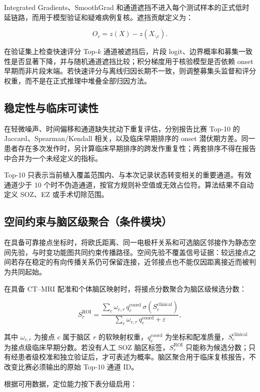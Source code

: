 Integrated Gradients、SmoothGrad 和通道遮挡不进入每个测试样本的正式低时延链路，而用于模型验证和疑难病例复核。遮挡贡献定义为：

$$
O_c=z(X)-z(X_{\setminus c}).
$$

在验证集上检查快速评分 Top-$k$ 通道被遮挡后，片段 logit、边界概率和募集一致性是否显著下降，并与随机通道遮挡比较；积分梯度用于核验模型是否依赖 onset 早期而非片段末端。若快速评分与离线归因长期不一致，则调整募集头监督和评分权重，而不是在正式推理中堆叠全部归因方法。

\subsection{稳定性与临床可读性}

在轻微噪声、时间偏移和通道缺失扰动下重复评估，分别报告比赛 Top-10 的 Jaccard、Spearman/Kendall 相关，以及临床早期排序的 onset 潜伏期方差。同一患者存在多次发作时，另计算临床早期排序的跨发作重复性；两套排序不得在报告中合并为一个未经定义的指标。

Top-10 只表示当前植入覆盖范围内、与本次记录状态转变相关的重要通道。有效通道少于 10 个时不伪造通道，按官方规则补空值或无效占位符。算法结果不自动定义 SOZ、EZ 或手术切除范围。

\subsection{空间约束与脑区级聚合（条件模块）}

在具备可靠接点坐标时，将欧氏距离、同一电极杆关系和可选脑区邻接作为静态空间先验，与时变功能图共同约束传播路径。空间先验不覆盖信号证据：较远接点之间若存在稳定的有向传播关系仍可保留连接，近邻接点也不能仅因距离接近而被判为共同起始。

在具备 CT--MRI 配准和个体脑区映射时，将接点分数聚合为脑区级候选分数：

$$
S_r^{\mathrm{ROI}}=
\frac{\sum_c\omega_{c,r}\,q_c^{\mathrm{coord}}\,\sigma(S_c^{\mathrm{clinical}})}
{\sum_c\omega_{c,r}\,q_c^{\mathrm{coord}}+\varepsilon},
$$

其中 $\omega_{c,r}$ 为接点 $c$ 属于脑区 $r$ 的软映射权重，$q_c^{\mathrm{coord}}$ 为坐标和配准质量，$S_c^{\mathrm{clinical}}$ 为接点级临床早期分数。若没有人工 SOZ 脑区标签，$S_r^{\mathrm{ROI}}$ 只能称为候选分数；只有经患者级校准和独立验证后，才可表述为概率。脑区聚合用于临床复核报告，不改变比赛必须输出的原始 Top-10 通道 ID。

根据可用数据，定位能力按下表分级启用：

